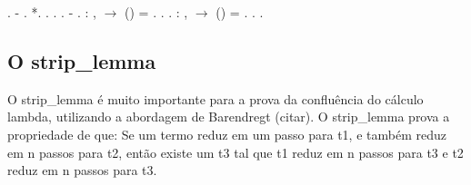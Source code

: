 \begin{coqdoccode}
\coqdocindent{2.00em}
 .\coqdoceol
\coqdocindent{1.00em}
-     .\coqdoceol
\coqdocindent{2.00em}
  *.\coqdoceol
\coqdocindent{2.00em}
   .\coqdoceol
\coqdocindent{2.00em}
 .\coqdoceol
\coqdocindent{2.00em}
 .\coqdoceol
\coqdocindent{1.00em}
- \coqdoceol
\coqdocindent{1.00em}
.\coqdoceol
\coqdocemptyline
\coqdocnoindent
{} : \coqdockw{\ensuremath{\forall}} ,   \ensuremath{\rightarrow} () = .\coqdoceol
\coqdocnoindent
{}.\coqdoceol
\coqdocindent{1.00em}
.\coqdoceol
\coqdocemptyline
\coqdocnoindent
{} : \coqdockw{\ensuremath{\forall}} ,   \ensuremath{\rightarrow} () = .\coqdoceol
\coqdocnoindent
{}.\coqdoceol
\coqdocindent{1.00em}
.\coqdoceol
\coqdocemptyline
\coqdocemptyline
\coqdocemptyline
\end{coqdoccode}
\subsection{O strip\_lemma}



 O strip\_lemma é muito importante para a prova da confluência do cálculo lambda, utilizando
a abordagem de Barendregt (citar). O strip\_lemma prova a propriedade de que: Se um termo reduz em um
passo para t1, e também reduz em n passos para t2, então existe um t3 tal que t1 reduz em n passos para t3
e t2 reduz em n passos para t3. 

